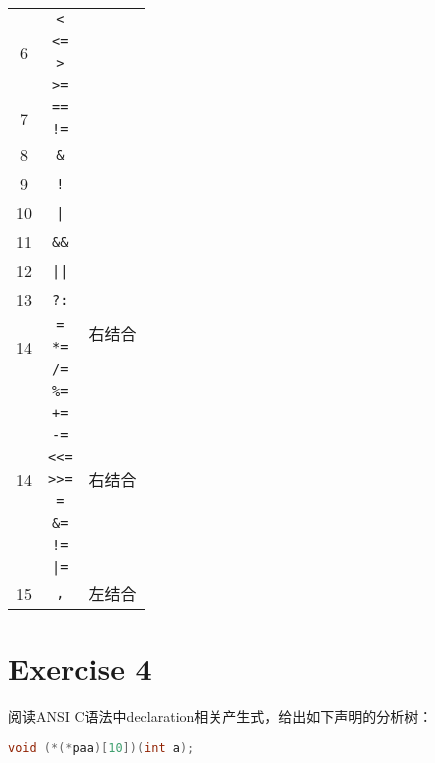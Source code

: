 \documentclass{article}
\begin{document}
\begin{longtable}{|c|c|c|}
    \multirow{4}{*}{6}
     & \texttt{<} &  \\ \cline{2-2}
     & \texttt{<=} &  \\ \cline{2-2}
     & \texttt{>} &  \\ \cline{2-2}
     & \texttt{>=} &  \\ \cline{1-2}
    \multirow{2}{*}{7}
     & \texttt{==} &  \\ \cline{2-2}
     & \texttt{!=} &  \\ \cline{1-2}
    8 & \texttt{\&} &  \\ \cline{1-2}
    9 & \texttt{!} &  \\ \cline{1-2}
    10 & \texttt{|} &  \\ \cline{1-2}
    11 & \texttt{\&\&} &  \\ \cline{1-2}
    12 & \texttt{||} &  \\ \hline
    13 & \texttt{?:} & \multirow{4}{*}{右结合} \\ \cline{1-2}
    \multirow{3}{*}{14}
     & \texttt{=} &  \\ \cline{2-2}
     & \texttt{*=} &  \\ \cline{2-2}
     & \texttt{/=} &  \\ \cline{2-2}
    \multirow{9}{*}{14}
     & \texttt{\%=} & \multirow{9}{*}{右结合} \\ \cline{2-2}
     & \texttt{+=} &  \\ \cline{2-2}
     & \texttt{-=} &  \\ \cline{2-2}
     & \texttt{{<}<=} & \\ \cline{2-2}
     & \texttt{{>}>=} &\\ \cline{2-2}
     & \texttt{=} &  \\ \cline{2-2}
     & \texttt{\&=} &  \\ \cline{2-2}
     & \texttt{!=} &  \\ \cline{2-2}
     & \texttt{|=} &  \\ \hline
    15 & \texttt{,} & 左结合 \\ \hline
\end{longtable}


\section{Exercise 4}
阅读ANSI C语法中declaration相关产生式，给出如下声明的分析树：
\begin{lstlisting}[language = C++,
         keywordstyle=\bfseries\color{blue!70},
         commentstyle=\color{red!40!green!60!blue},
         frame=shadowbox,
         rulesepcolor=\color{red!20!green!30!blue!20},
         basicstyle=\ttfamily]
  void (*(*paa)[10])(int a);
\end{lstlisting}
\end{document}
